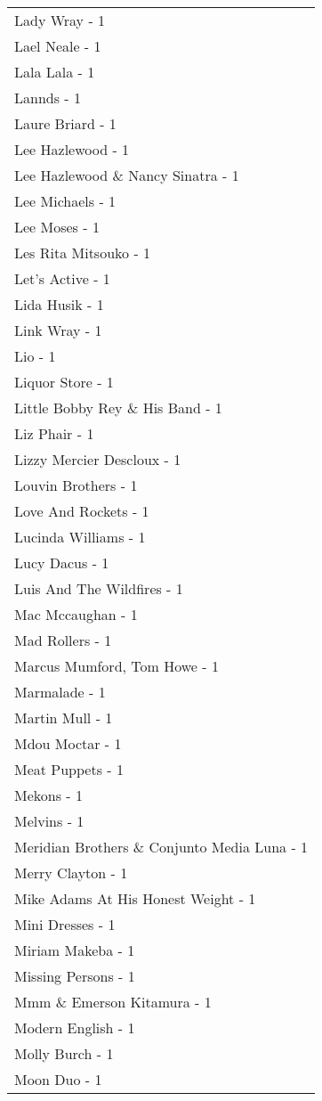 \documentclass[
]{article}
\begin{document}
\begin{longtable}{l}
Lady Wray - 1 \\ 
Lael Neale - 1 \\ 
Lala Lala - 1 \\ 
Lannds - 1 \\ 
Laure Briard - 1 \\ 
Lee Hazlewood - 1 \\ 
Lee Hazlewood \& Nancy Sinatra - 1 \\ 
Lee Michaels - 1 \\ 
Lee Moses - 1 \\ 
Les Rita Mitsouko - 1 \\ 
Let's Active - 1 \\ 
Lida Husik - 1 \\ 
Link Wray - 1 \\ 
Lio - 1 \\ 
Liquor Store - 1 \\ 
Little Bobby Rey \& His Band - 1 \\ 
Liz Phair - 1 \\ 
Lizzy Mercier Descloux - 1 \\ 
Louvin Brothers - 1 \\ 
Love And Rockets - 1 \\ 
Lucinda Williams - 1 \\ 
Lucy Dacus - 1 \\ 
Luis And The Wildfires - 1 \\ 
Mac Mccaughan - 1 \\ 
Mad Rollers - 1 \\ 
Marcus Mumford, Tom Howe - 1 \\ 
Marmalade - 1 \\ 
Martin Mull - 1 \\ 
Mdou Moctar - 1 \\ 
Meat Puppets - 1 \\ 
Mekons - 1 \\ 
Melvins - 1 \\ 
Meridian Brothers \& Conjunto Media Luna - 1 \\ 
Merry Clayton - 1 \\ 
Mike Adams At His Honest Weight - 1 \\ 
Mini Dresses - 1 \\ 
Miriam Makeba - 1 \\ 
Missing Persons - 1 \\ 
Mmm \& Emerson Kitamura - 1 \\ 
Modern English - 1 \\ 
Molly Burch - 1 \\ 
Moon Duo - 1 \\ 

\end{longtable}
\end{document}
